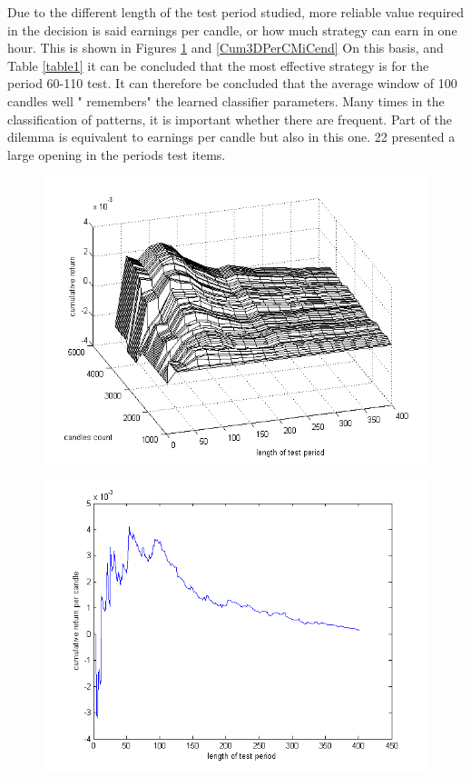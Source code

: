 \documentclass{tewiart}
\begin{document}
Due to the different length of the test period studied, more reliable value required in the decision is said earnings per candle, 
or how much strategy can earn in one hour. This is shown in Figures \ref{Cum3DPerCMiC} and \ref{Cum3DPerCMiCend} On this basis, and Table \ref{table1} it can be concluded that the
 most effective strategy is for the period 60-110 test.
It can therefore be concluded that the average window of 100 candles well " remembers" the learned classifier parameters. 
Many times in the classification of patterns, it is important whether there are frequent. 
Part of the dilemma is equivalent to earnings per candle but also in this one. 22 presented a large opening in
 the periods test items.\\

\begin{figure}[h!]
\centering
\begin{minipage}{.45\linewidth}
\begin{center}
\includegraphics[width=\textwidth]{pictures/cumulativeReturnsPerCandleC.png}
\label{Cum3DPerCMiC}
\end{center}
\end{minipage}
\begin{minipage}{.45\linewidth}
\begin{center}
\includegraphics[width=\textwidth]{pictures/mic_percandle_end.png}

\end{center}
\end{minipage}
\end{figure}
\end{document}
